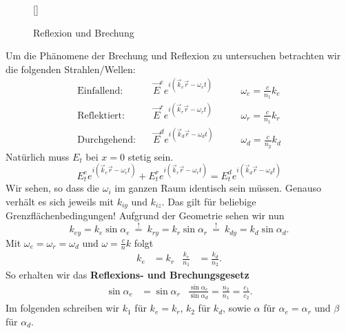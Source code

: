 \begin{wrapfigure}[11]{r}[0cm]{0cm}
	\raisebox{0pt}[\dimexpr{}\baselineskip\relax]{
		\colorbox{hgrey}{
		}
	}
	\caption{Reflexion und Brechung}
\end{wrapfigure}
Um die Phänomene der Brechung und Reflexion zu untersuchen betrachten wir die folgenden Strahlen/Wellen:
\begin{align*}
\text{Einfallend:}\quad &\vec{E}^e e^{i(\vec{k}_e\vec{r}-\omega_e t)} &\qquad \omega_e =\frac{c}{n_1}k_e \\
\text{Reflektiert:}\quad&\vec{E}^r e^{i(\vec{k}_r\vec{r}-\omega_r t)} &\qquad \omega_r = \frac{c}{n_1}k_r \\
\text{Durchgehend:}\quad &\vec{E}^d e^{i(\vec{k}_d\vec{r}-\omega_d t)}&\qquad \omega_d=\frac{c}{n_2}k_d
\end{align*}
Natürlich muss $E_t$ bei $x=0$ stetig sein. 
\begin{equation*}
E_t^e e^{i(\vec{k}_e\vec{r}-\omega_e t)} + E_t^r e^{i(\vec{k}_r\vec{r}-\omega_r t)} = E_t^d e^{i(\vec{k}_d\vec{r}-\omega_d t)}
\end{equation*}
Wir sehen, so dass die $\omega_i$ im ganzen Raum identisch sein müssen. Genauso verhält es sich jeweils mit $k_{iy}$ und $k_{iz}$. Das gilt für beliebige Grenzflächenbedingungen! Aufgrund der Geometrie sehen wir nun
\begin{equation*}
k_{ey}=k_e\sin\alpha_e\ \stackrel{!}{=}\ k_{ry} = k_r\sin\alpha_r\ \stackrel{!}{=}\
k_{dy}=k_d\sin\alpha_d.
\end{equation*}
Mit $\omega_e=\omega_r=\omega_d$ und $\omega=\frac{c}{n}k$ folgt
\begin{align*}
k_e&=k_r &\frac{k_e}{n_1}&=\frac{k_d}{n_2}.
\end{align*}
So erhalten wir das \textbf{Reflexions- und Brechungsgesetz}
\begin{align*}
\sin\alpha_e &=\sin\alpha_r &\frac{\sin\alpha_e}{\sin\alpha_d}=\frac{n_2}{n_1}=\frac{c_1}{c_2}.
\end{align*}
Im folgenden schreiben wir $k_1$ für $k_e=k_r$, $k_2$ für $k_d$, sowie $\alpha$ für $\alpha_e=\alpha_r$ und $\beta$ für $\alpha_d$.\\

